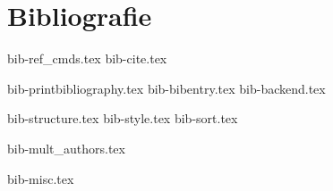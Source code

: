 \documentclass[presentatie.tex]{subfiles}
\begin{document}
\section{Bibliografie}

\clearrecentlist



{bib-ref_cmds.tex}
{bib-cite.tex}

{bib-printbibliography.tex}
{bib-bibentry.tex}
{bib-backend.tex}

{bib-structure.tex}
{bib-style.tex}
{bib-sort.tex}

{bib-mult_authors.tex}


{bib-misc.tex}
\end{document}
